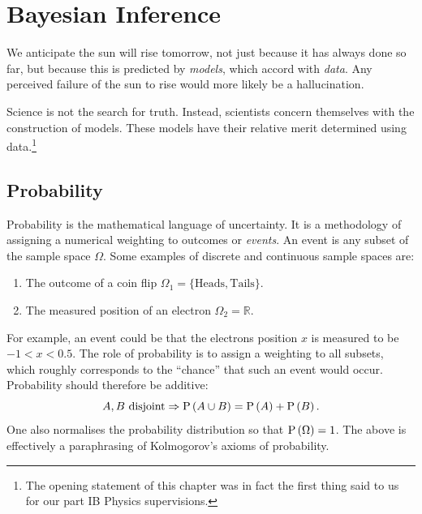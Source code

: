 \chapter{Bayesian Inference}
\label{chap:bay}

\epigraph{We anticipate the sun will rise tomorrow, not just because it has always done so far, but because this is predicted by {\em models}, which accord with {\em data}. Any perceived failure of the sun to rise would more likely be a hallucination.}{\davidmackay{}}

%
%


Science is not the search for truth. Instead, scientists concern themselves with the construction of models. These models have their relative merit determined using data.\footnote{The opening statement of this chapter was in fact the first thing \rafiblumenfeld{} said to us for our part IB Physics supervisions.}


\section{Probability}
\label{sec:bay:prob}

Probability is the mathematical language of uncertainty. It is a methodology of assigning a numerical weighting to outcomes or {\em events}. An event is any subset of the sample space $\Omega$. Some examples of discrete and continuous sample spaces are:
\begin{enumerate}
  \item The outcome of a coin flip $\Omega_1=\{\mathrm{Heads},\mathrm{Tails}\}$.
  \item The measured position of an electron $\Omega_2=\mathbb{R}$.
\end{enumerate}
For example, an event could be that the electrons position $x$ is measured to be $-1<x<0.5$. The role of probability is to assign a weighting to all subsets, which roughly corresponds to the ``chance'' that such an event would occur. Probability should therefore be additive:
\begin{equation}
  A,B \mathrm{\ disjoint} \Rightarrow \mathrm{P}\left(A \cup B\right) = \mathrm{P}\left(A\right) + \mathrm{P}\left(B\right).
  \label{eqn:bay:add}
\end{equation}
One also normalises the probability distribution so that $\mathrm{P}\left(\Omega\right) = 1$. The above is effectively a paraphrasing of Kolmogorov's axioms of probability.


